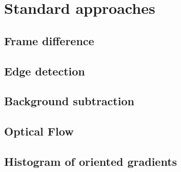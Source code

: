 \chapter{Standard approaches}

\section*{Frame difference}
\section*{Edge detection}
\section*{Background subtraction}
\section*{Optical Flow}
\section*{Histogram of oriented gradients}
